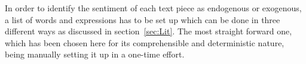 In order to identify the sentiment of each text piece as endogenous or exogenous, a list of words and expressions has to be set up which can be done in three different ways as discussed in section~\ref{sec:Lit}. The most straight forward one, which has been chosen here for its comprehensible and deterministic nature, being manually setting it up in a one-time effort. 













